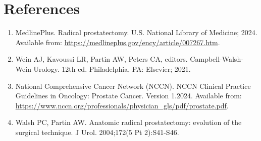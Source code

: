 \section*{References}
\begin{enumerate}
  \item MedlinePlus. Radical prostatectomy. U.S. National Library of Medicine; 2024. Available from: \url{https://medlineplus.gov/ency/article/007267.htm}.
  
  \item Wein AJ, Kavoussi LR, Partin AW, Peters CA, editors. Campbell-Walsh-Wein Urology. 12th ed. Philadelphia, PA: Elsevier; 2021.
  
  \item National Comprehensive Cancer Network (NCCN). NCCN Clinical Practice Guidelines in Oncology: Prostate Cancer. Version 1.2024. Available from: \url{https://www.nccn.org/professionals/physician_gls/pdf/prostate.pdf}.
  
  \item Walsh PC, Partin AW. Anatomic radical prostatectomy: evolution of the surgical technique. J Urol. 2004;172(5 Pt 2):S41-S46.
\end{enumerate}

\clearpage
